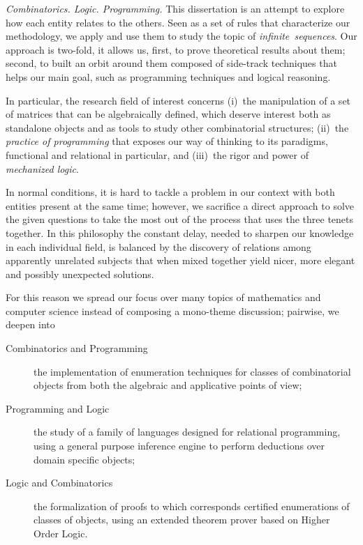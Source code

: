 


\textit{Combinatorics. Logic. Programming.} This dissertation is an attempt to
explore how each entity relates to the others. Seen as a set of rules that
characterize our methodology, we apply and use them to study the topic of
\textit{infinite~sequences}.  Our approach is two-fold, it allows us, first, to
prove theoretical results about them; second, to built an orbit around them
composed of side-track techniques that helps our main goal, such as programming
techniques and logical reasoning.

In particular, the research field of interest concerns (i)~the manipulation of
a set of matrices that can be algebraically defined, which deserve interest
both as standalone objects and as tools to study other combinatorial
structures; (ii)~the \textit{practice of programming} that exposes our way of
thinking to its paradigms, functional and relational in particular, and
(iii)~the rigor and power of \textit{mechanized logic}.

In normal conditions, it is hard to tackle a problem in our context with both
entities present at the same time; however, we sacrifice a direct approach to
solve the given questions to take the most out of the process that uses the
three tenets together. In this philosophy the constant delay, needed to sharpen
our knowledge in each individual field, is balanced by the discovery of
relations among apparently unrelated subjects that when mixed together yield
nicer, more elegant and possibly unexpected solutions.

For this reason we spread our focus over many topics of mathematics and
computer science instead of composing a mono-theme discussion; pairwise,
we deepen into
\begin{description}

    \item[Combinatorics and Programming] the implementation of enumeration
    techniques for classes of combinatorial objects from both the algebraic
    and applicative points of view;

    \item[Programming and Logic] the study of a family of languages designed
    for relational programming, using a general purpose inference engine to 
    perform deductions over domain specific objects;

    \item[Logic and Combinatorics] the formalization of proofs to which
    corresponds certified enumerations of classes of objects, using an extended
    theorem prover based on Higher Order Logic.

\end{description}

